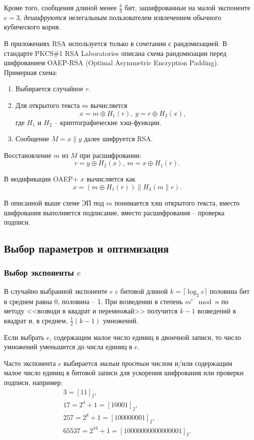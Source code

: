 Кроме того, сообщения длиной менее $\frac{k}{3}$ бит, зашифрованные на малой экспоненте $e=3$, \emph{дешифруются} нелегальным пользователем извлечением обычного кубического корня.

В приложениях RSA используется только в сочетании с рандомизацией. В стандарте PKCS\#1 RSA Laboratories описана схема рандомизации перед шифрованием OAEP-RSA (Optimal Asymmetric Encryption Padding). Примерная схема:
\begin{enumerate}
    \item Выбирается случайное $r$.
    \item Для открытого текста $m$ вычисляется
        \[ x = m \oplus H_1(r), ~ y = r \oplus H_2(x), \]
        где $H_1$ и $H_2$ -- криптографические хэш-функции.
    \item Сообщение $M = x \| y$ далее шифруется RSA.
\end{enumerate}
Восстановление $m$ из $M$ при расшифровании:
    \[ r = y \oplus H_2(x), ~ m = x \oplus H_1(r). \]

В модификации OAEP+ $x$ вычисляется как
    \[ x = (m \oplus H_1(r)) \| H_3(m \| r). \]

В описанной выше схеме ЭП под $m$ понимается хэш открытого текста, вместо шифрования выполняется подписание, вместо расшифрования -- проверка подписи.


\subsection{Выбор параметров и оптимизация}

\subsubsection{Выбор экспоненты $e$}

В случайно выбранной экспоненте $e$ c битовой длиной $k = \lceil \log_2 e \rceil$ половина бит в среднем равна 0, половина -- 1. При возведении в степень $m^e \mod n$ по методу <<возводи в квадрат и перемножай>> получится $k-1$ возведений в квадрат и, в среднем,
 $\frac{1}{2}(k-1)$ умножений.

Если выбрать $e$, содержащим малое число единиц в двоичной записи, то число умножений уменьшится до числа единиц в $e$.

Часто экспонента $e$ выбирается  \emph{малым} \emph{простым} числом и/или содержащим малое число единиц в битовой записи для ускорения шифрования или проверки подписи, например:
\[
    \begin{array}{l}
        3 = [11]_2, \\
        17 = 2^4+1 = [10001]_2, \\
        257 = 2^8+1 = [100000001]_2, \\
        65537 = 2^{16}+1 = [10000000000000001]_2.
    \end{array}
\]

